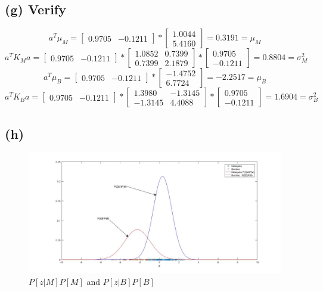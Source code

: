 \documentclass[a4paper,11pt]{article}
\begin{document}
\subsection*{(g) Verify}
 \[
 a^T\mu_M =
   \begin{bmatrix}
    0.9705&-0.1211
  \end{bmatrix}
  *
  \begin{bmatrix}
   1.0044\\
   5.4160
  \end{bmatrix}
 =0.3191= \mu_M
\]
 \[
 a^TK_Ma =
   \begin{bmatrix}
    0.9705&-0.1211
  \end{bmatrix}
  *
  \begin{bmatrix}
    1.0852 & 0.7399\\
    0.7399 & 2.1879
  \end{bmatrix}
  *
   \begin{bmatrix}
    0.9705\\
    -0.1211
  \end{bmatrix}
 =0.8804= \sigma_{M}^2
\]
 \[
 a^T\mu_B =
   \begin{bmatrix}
    0.9705&-0.1211
  \end{bmatrix}
  *
  \begin{bmatrix}
   -1.4752\\
    6.7724
  \end{bmatrix}
 =-2.2517= \mu_B
\]
 \[
 a^TK_Ba =
   \begin{bmatrix}
    0.9705&-0.1211
  \end{bmatrix}
  *
  \begin{bmatrix}
    1.3980 &  -1.3145\\
   -1.3145 &  4.4088
  \end{bmatrix}
  *
   \begin{bmatrix}
    0.9705\\
    -0.1211
  \end{bmatrix}
 =1.6904= \sigma_{B}^2
\]
\clearpage
\newpage
\subsection*{(h)}
\begin{figure}[h]
  \hspace*{-6cm}
   \includegraphics[scale=0.5]{q1_g_1}
   \caption{$P[z\vert M]P[M]$ and $P[z\vert B]P[B]$}\label{fig:q1_g_1}
\end{figure}
\clearpage
\newpage
\end{document}
